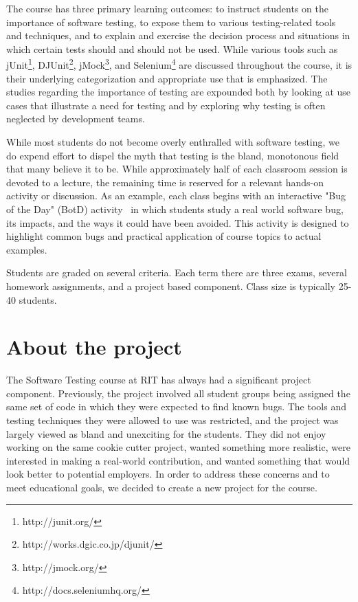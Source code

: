\documentclass{sig-alternate}
\begin{document}
The course has three primary learning outcomes: to instruct students on the importance of software testing, to expose them to various testing-related tools and techniques, and to explain and exercise the decision process and situations in which certain tests should and should not be used. While various tools such as jUnit\footnote{http://junit.org/}, DJUnit\footnote{http://works.dgic.co.jp/djunit/}, jMock\footnote{http://jmock.org/}, and Selenium\footnote{http://docs.seleniumhq.org/} are discussed throughout the course, it is their underlying categorization and appropriate use that is emphasized. The studies regarding the importance of testing are expounded both by looking at use cases that illustrate a need for testing  and by exploring why testing is often neglected by development teams.

While most students do not become overly enthralled with software testing, we do expend effort to dispel the myth that testing is the bland, monotonous field that many believe it to be. While approximately half of each classroom session is devoted to a lecture, the remaining time is reserved for a relevant hands-on activity or discussion. As an example, each class begins with an interactive "Bug of the Day" (BotD) activity~\cite{krutz_BotD} in which students study a real world software bug, its impacts, and the ways it could have been avoided.  This activity is designed to highlight common bugs and practical application of course topics to actual examples.

Students are graded on several criteria. Each term there are three exams, several homework assignments, and a project based component. Class size is typically 25-40 students.


\section{About the project}
\label{sec: aboutproject}

The Software Testing course at RIT has always had a significant project component. Previously, the project involved all student groups being assigned the same set of code in which they were expected to find known bugs. The tools and testing techniques they were allowed to use was restricted, and the project was largely viewed as bland and unexciting for the students. They did not enjoy working on the same cookie cutter project, wanted something more realistic, were interested in making a real-world contribution, and wanted something that would look better to potential employers. In order to address these concerns and to meet educational goals, we decided to create a new project for the course.
\end{document}
